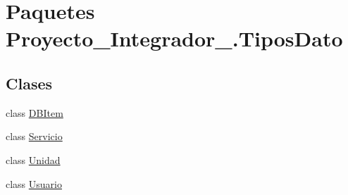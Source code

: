 \hypertarget{namespace_proyecto___integrador__3_1_1_tipos_dato}{\section{Paquetes Proyecto\-\_\-\-Integrador\-\_.\-Tipos\-Dato}
\label{namespace_proyecto___integrador__3_1_1_tipos_dato}
}
\subsection*{Clases}
\begin{DoxyCompactItemize}
\item 
class \hyperlink{class_proyecto___integrador__3_1_1_tipos_dato_1_1_d_b_item}{D\-B\-Item}
\item 
class \hyperlink{class_proyecto___integrador__3_1_1_tipos_dato_1_1_servicio}{Servicio}
\item 
class \hyperlink{class_proyecto___integrador__3_1_1_tipos_dato_1_1_unidad}{Unidad}
\item 
class \hyperlink{class_proyecto___integrador__3_1_1_tipos_dato_1_1_usuario}{Usuario}
\end{DoxyCompactItemize}
